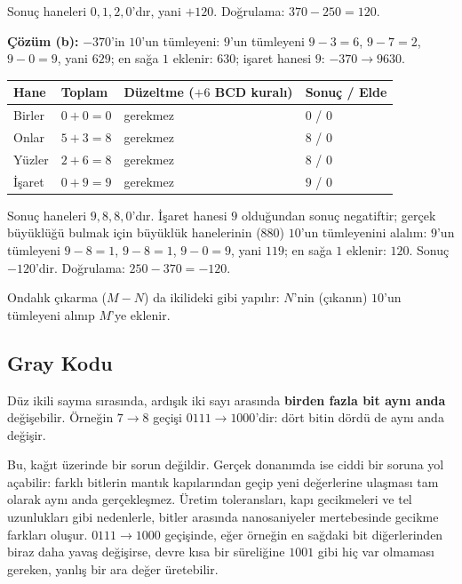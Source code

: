Sonuç haneleri $0,1,2,0$'dır, yani $+120$. Doğrulama: $370-250=120$.

\noindent\textbf{Çözüm (b):} $-370$'in $10$'un tümleyeni: $9$'un tümleyeni $9-3=6$,
$9-7=2$, $9-0=9$, yani $629$; en sağa $1$ eklenir: $630$; işaret hanesi $9$: $-370\to9630$.

\begin{center}
\small
\begin{tabular}{@{}lp{3.6cm}p{2.6cm}p{2.8cm}@{}}
\toprule
Hane & Toplam & Düzeltme ($+6$ BCD kuralı) & Sonuç / Elde \\
\midrule
Birler & $0+0=0$ & gerekmez & $0$ / $0$ \\
Onlar & $5+3=8$ & gerekmez & $8$ / $0$ \\
Yüzler & $2+6=8$ & gerekmez & $8$ / $0$ \\
İşaret & $0+9=9$ & gerekmez & $9$ / $0$ \\
\bottomrule
\end{tabular}
\end{center}

Sonuç haneleri $9,8,8,0$'dır. İşaret hanesi $9$ olduğundan sonuç negatiftir; gerçek
büyüklüğü bulmak için büyüklük hanelerinin ($880$) $10$'un tümleyenini alalım: $9$'un
tümleyeni $9-8=1$, $9-8=1$, $9-0=9$, yani $119$; en sağa $1$ eklenir: $120$. Sonuç
$-120$'dir. Doğrulama: $250-370=-120$.

Ondalık çıkarma ($M-N$) da ikilideki gibi yapılır: $N$'nin (çıkanın) $10$'un tümleyeni
alınıp $M$'ye eklenir.

\subsection{Gray Kodu}
\label{sec:gray-kodu}

Düz ikili sayma sırasında, ardışık iki sayı arasında \textbf{birden fazla bit aynı anda}
değişebilir. Örneğin $7\to8$ geçişi $0111\to1000$'dir: dört bitin dördü de aynı anda
değişir.

Bu, kağıt üzerinde bir sorun değildir. Gerçek donanımda ise ciddi bir soruna yol açabilir:
farklı bitlerin mantık kapılarından geçip yeni değerlerine ulaşması tam olarak aynı anda
gerçekleşmez. Üretim toleransları, kapı gecikmeleri ve tel uzunlukları gibi nedenlerle,
bitler arasında nanosaniyeler mertebesinde gecikme farkları oluşur. $0111\to1000$
geçişinde, eğer örneğin en sağdaki bit diğerlerinden biraz daha yavaş değişirse, devre
kısa bir süreliğine $1001$ gibi hiç var olmaması gereken, yanlış bir ara değer üretebilir.

